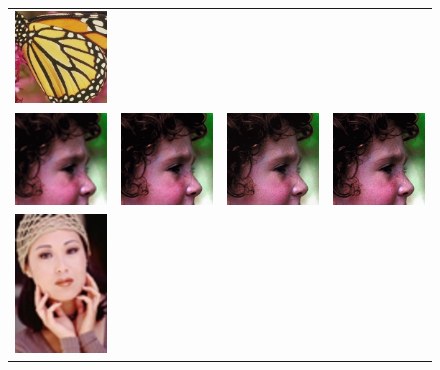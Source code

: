 \documentclass[10pt,twocolumn,letterpaper]{article}
\begin{document}
\begin{figure}[h!]
\begin{tabular}{cccc}
     	\includegraphics[width=1.4in]{images/used/appendix/jpg/Set5/butterfly_HR} \\
       	\includegraphics[width=1.4in]{images/used/appendix/jpg/Set5/head_bicubic}&
     	\includegraphics[width=1.4in]{images/used/appendix/jpg/Set5/head_SRResNet-MSE} &
     	\includegraphics[width=1.4in]{images/used/appendix/jpg/Set5/head_SRGAN-VGG54} &
     	\includegraphics[width=1.4in]{images/used/appendix/jpg/Set5/head_HR} \\
     	\includegraphics[width=1.4in]{images/used/appendix/jpg/Set5/woman_bicubic}&

\end{tabular}
\end{figure}
\end{document}
